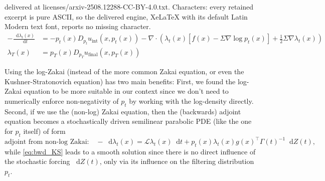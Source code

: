 \documentclass[10pt,a4paper]{amsart}
\newcommand{\cL}{\mathcal L}
\newcommand{\dd }{\mathop{}\!\mathrm{d}}
\begin{document}
delivered at licenses/arxiv-2508.12288-CC-BY-4.0.txt. Characters: every retained excerpt is pure ASCII, so the delivered engine, XeLaTeX with its default Latin Modern text font, reports no missing character.
\begin{align}\label{eq:bwd_KS}
    -\frac{\dd\lambda_t(x)}{\dd t} &= -p_t(x) D_{p_t}u_\mathrm{int}(x,p_t(x)) -\nabla \cdot \left(\lambda_t(x) [f(x) -\Sigma \nabla \log p_t(x)] + \frac{1}{2} \Sigma \nabla \lambda_t(x) \right)\\
    \lambda_T(x) &= p_T(x) D_{p_T}u_\mathrm{final}(x,p_T(x))
\end{align}

\begin{rem}
    Using the log-Zakai (instead of the more common Zakai equation, or even the Kushner-Stratonovich equation) has two main benefits: First, we found the log-Zakai equation to be more suitable in our context since we don't need to numerically enforce non-negativity of $p_t$ by working with the log-density directly. Second, if we use the (non-log) Zakai equation, then the (backwards) adjoint equation becomes a stochastically driven semilinear parabolic PDE (like the one for $p_t$ itself) of form
    \begin{equation*}
        \text{adjoint from non-log Zakai:} \quad-\dd \lambda_t(x) = \cL \lambda_t(x)\dd t + p_t(x)\lambda_t(x) g(x)^\top \Gamma(t)^{-1}\dd Z(t),
    \end{equation*}
    while \eqref{eq:bwd_KS} leads to a smooth solution since there is no direct influence of the stochastic forcing $\dd Z(t)$, only via its influence on the filtering distribution $p_t$.
\end{rem}
\end{document}
